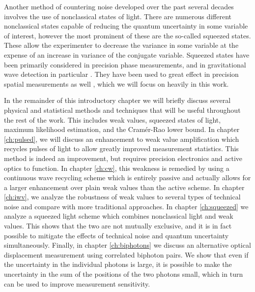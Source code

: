 Another method of countering noise developed over the past several decades involves the use of nonclassical states of light.  There are numerous different nonclassical states capable of reducing the quantum uncertainty in some variable of interest, however the most prominent of these are the so-called squeezed states.  These allow the experimenter to decrease the variance in some variable at the expense of an increase in variance of the conjugate variable.  Squeezed states have been primarily considered in precision phase measurements, and in gravitational wave detection in particular \cite{Caves1981, Vahlbruch2005}.  They have been used to great effect in precision spatial measurements as well \cite{Barnett2003, Treps2002, Treps2003}, which we will focus on heavily in this work. 

In the remainder of this introductory chapter we will briefly discuss several physical and statistical methods and techniques that will be useful throughout the rest of the work.  This includes weak values, squeezed states of light, maximum likelihood estimation, and the Cram\'{e}r-Rao lower bound.  In chapter \ref{ch:pulsed}, we will discuss an enhancement to weak value amplification which recycles pulses of light to allow greatly improved measurement statistics.  This method is indeed an improvement, but requires precision electronics and active optics to function.  In chapter \ref{ch:cw}, this weakness is remedied by using a continuous wave recycling scheme which is entirely passive and actually allows for a larger enhancement over plain weak values than the active scheme.  In chapter \ref{ch:iwv}, we analyze the robustness of weak values to several types of technical noise and compare with more traditional approaches.  In chapter \ref{ch:squeezed} we analyze a squeezed light scheme which combines nonclassical light and weak values.  This shows that the two are not mutually exclusive, and it is in fact possible to mitigate the effects of technical noise and quantum uncertainty simultaneously.  Finally, in chapter \ref{ch:biphotons} we discuss an alternative optical displacement measurement using correlated biphoton pairs.  We show that even if the uncertainty in the individual photons is large, it is possible to make the uncertainty in the sum of the positions of the two photons small, which in turn can be used to improve measurement sensitivity.  

